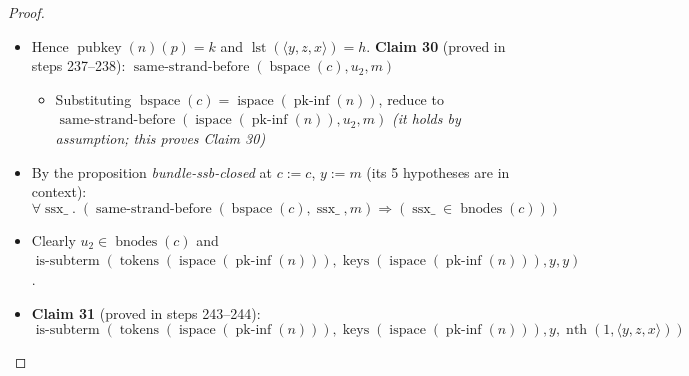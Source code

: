 \documentclass[11pt]{article}
\theoremstyle{plain}
\begin{document}
\begin{proof}
\begin{itemize}[leftmargin=2.8em, itemsep=4pt, parsep=1pt]
\begin{itemize}[leftmargin=2.8em, itemsep=4pt, parsep=1pt]
  \item[\textbf{235--236}] Hence $\operatorname{pubkey}(n)(p) = k$ and $\operatorname{lst}(\langle y, z, x \rangle) = h$. \textbf{Claim 30} (proved in steps 237--238): $\operatorname{same\text{-}strand\text{-}before}(\operatorname{bspace}(c), u_{2}, m)$
  \begin{itemize}[leftmargin=2.8em, itemsep=4pt, parsep=1pt]
  \item[\textbf{237--238}] Substituting $\operatorname{bspace}(c) = \operatorname{ispace}(\operatorname{pk\text{-}inf}(n))$, reduce to $\operatorname{same\text{-}strand\text{-}before}(\operatorname{ispace}(\operatorname{pk\text{-}inf}(n)), u_{2}, m)$  \emph{(it holds by assumption; this proves Claim 30)}
  \end{itemize}
  \item[\textbf{239}] By the proposition \emph{bundle-ssb-closed} at $c := c$, $y := m$ (its 5 hypotheses are in context):
\begin{equation*}
\forall \operatorname{ssx\_}.\; (\operatorname{same\text{-}strand\text{-}before}(\operatorname{bspace}(c), \operatorname{ssx\_}, m) \Rightarrow (\operatorname{ssx\_} \in \operatorname{bnodes}(c)))
\end{equation*}

  \item[\textbf{240--241}] Clearly $u_{2} \in \operatorname{bnodes}(c)$ and $\operatorname{is\text{-}subterm}(\operatorname{tokens}(\operatorname{ispace}(\operatorname{pk\text{-}inf}(n))), \operatorname{keys}(\operatorname{ispace}(\operatorname{pk\text{-}inf}(n))), y, y)$.
  \item[\textbf{242}] \textbf{Claim 31} (proved in steps 243--244):
\begin{equation*}
\operatorname{is\text{-}subterm}(\operatorname{tokens}(\operatorname{ispace}(\operatorname{pk\text{-}inf}(n))), \operatorname{keys}(\operatorname{ispace}(\operatorname{pk\text{-}inf}(n))), y, \operatorname{nth}(1, \langle y, z, x \rangle))
\end{equation*}


\end{itemize}
\end{itemize}
\end{proof}
\end{document}
